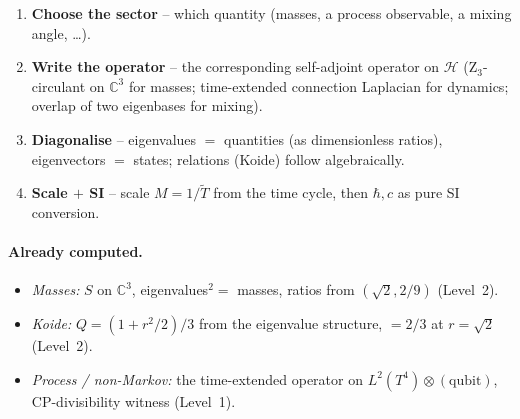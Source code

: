 \begin{keyresult}
\begin{enumerate}
  \item \textbf{Choose the sector} -- which quantity (masses, a process
        observable, a mixing angle, \dots).
  \item \textbf{Write the operator} -- the corresponding self-adjoint operator
        on $\mathcal{H}$ (Z$_3$-circulant on $\mathbb{C}^3$ for masses;
        time-extended connection Laplacian for dynamics; overlap of two
        eigenbases for mixing).
  \item \textbf{Diagonalise} -- eigenvalues $=$ quantities (as dimensionless
        ratios), eigenvectors $=$ states; relations (Koide) follow
        algebraically.
  \item \textbf{Scale $+$ SI} -- scale $M=1/\tilde T$ from the time cycle, then
        $\hbar,c$ as pure SI conversion.
\end{enumerate}
\end{keyresult}

\paragraph{Already computed.}
\begin{itemize}
  \item \emph{Masses:} $S$ on $\mathbb{C}^3$, eigenvalues$^2=$ masses, ratios
        from $(\sqrt2,2/9)$ (Level~2).
  \item \emph{Koide:} $Q=(1+r^2/2)/3$ from the eigenvalue structure, $=2/3$ at
        $r=\sqrt2$ (Level~2).
  \item \emph{Process / non-Markov:} the time-extended operator on
        $L^2(T^4)\otimes(\text{qubit})$, CP-divisibility witness (Level~1).
\end{itemize}

